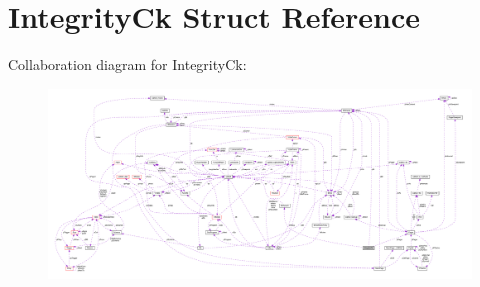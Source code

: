 \hypertarget{struct_integrity_ck}{\section{Integrity\-Ck Struct Reference}
\label{struct_integrity_ck}
}


Collaboration diagram for Integrity\-Ck\-:\nopagebreak
\begin{figure}[H]
\begin{center}
\leavevmode
\includegraphics[width=350pt]{struct_integrity_ck__coll__graph}
\end{center}
\end{figure}
